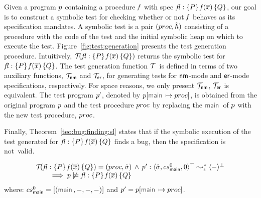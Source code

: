 Given a \jsil program $p$ containing a procedure $\mathit{f}$ with spec {\small ${\mathit{fl}} : \{ P \} \, \mathit{f}(\overline{x}) \, \{ Q \}$}, 
our goal is to construct a symbolic test for checking whether or not $\mathit{f}$ behaves as its specification mandates.
A symbolic test is a pair $(proc, \hat{h})$ consisting of a \jsil procedure with the code of the test and the initial 
symbolic heap on which to execute the test. 
%
Figure~\ref{fig:test:generation} presents the test generation procedure. Intuitively, $\mathcal{T}_{}({\mathit{fl}} : \{ P \} \, \mathit{f}(\overline{x}) \, \{ Q \})$ 
returns the symbolic test for ${\mathit{fl}} : \{ P \} \, \mathit{f}(\overline{x}) \, \{ Q \}$. The test generation function $\testifyfun{} \ $ is defined in terms 
of two auxiliary functions, $\mathcal{T}_{{\sf nm}}$ and $\mathcal{T}_{{\sf er}}$, for generating tests for ${\sf nm}$-mode and 
${\sf er}$-mode specifications, respectively. 
For space reasons, we only present $\mathcal{T}_{{\sf nm}}$, $\mathcal{T}_{{\sf er}}$ is equivalent. 
The test program $p'$, denoted by $\prog[\jsilmain \mapsto \proc]$, is obtained from the original program $p$ and the test procedure $proc$ by replacing the 
$\jsilmain$ of $p$ with the new test procedure, $proc$. 

Finally, Theorem~\ref{teo:bug:finding:sl} states that if the symbolic execution of the 
test generated for ${\mathit{fl}} : \{ P \} \, \mathit{f}(\overline{x}) \, \{ Q \}$ finds a bug, then the specification 
is not~valid.

\begin{theorem}\label{teo:bug:finding:sl}
$$
\begin{array}{l}
\testify{}(\specsig{\pass}{\pid(\jvec{x})}{\qass}{\flag})  = (\proc, \sstate) \, \wedge \, 
  \prog' :  \transabssemrule{\sstate, \csmain, 0}{-}{\top}{\bot}{\symbolic} \\ \quad \quad 
    \implies  
         \prog \not\satisfies \specsig{\pass}{\pid(\jvec{x})}{\qass}{\flag}
\end{array}
$$
\noindent where:  $\csmain = [ (\jsilmain, -, -, -) ]$ 
and $\prog' = \prog[\jsilmain \mapsto \proc]$.
\end{theorem}



